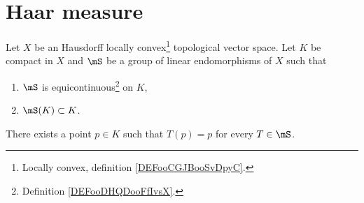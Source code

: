 \section{Haar measure}

\begin{theorem}     \label{THOooWXQFooQrWcLY}
    Let \( X\) be an Hausdorff locally convex\footnote{Locally convex, definition \ref{DEFooCGJBooSvDpyC}.} topological vector space. Let \( K\) be compact in \( X\) and \( \mS\) be a group of linear endomorphisms of \( X\) such that
    \begin{enumerate}
        \item
            \( \mS\) is equicontinuous\footnote{Definition \ref{DEFooDHQDooFfIvsX}.} on \( K\),
        \item
            \( \mS(K)\subset K\).
    \end{enumerate}
    There exists a point \( p\in K\) such that \( T(p)=p\) for every \( T\in \mS\).
\end{theorem}

